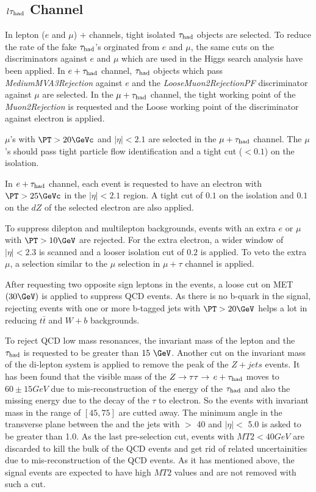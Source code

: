 \subsection{\texorpdfstring{$\,l\tau_{\rm had}$ Channel}{lepton-tau Channel}}
\label{sect:eleTauCuts}
In lepton ($e$ and $\mu$) $+$ \Tau channels, tight isolated $\tau_{\rm had}$ objects are selected. To reduce the rate of the fake $\tau_{\rm had}$'s orginated from $e$ and $\mu$, the same cuts on the discriminators against $e$ and $\mu$ which are used in the Higgs search analysis \cite{CMS_AN_2013-188} have been applied. In $e + \tau_{\rm had}$ channel, $\tau_{\rm had}$ objects which pass \emph{MediumMVA3Rejection} against $e$ and the \emph{LooseMuon2RejectionPF} discriminator against $\mu$ are selected. In the $\mu + \tau_{\rm had}$ channel, the tight working point of the \emph{Muon2Rejection} is requested and the Loose working point of the discriminator against electron is applied.

$\mu$'s with $\PT > 20 \GeVc$ and $|\eta|<2.1$ are selected in the $\mu + \tau_{\rm had}$ channel. The $\mu$'s should pass tight particle flow identification and a tight cut ($<0.1$) on the isolation.
 
In $e + \tau_{\rm had}$ channel, each event is requested to have an electron with $\PT >25 \GeVc$ in the $|\eta| < 2.1 $ region. A tight cut of $0.1$ on the isolation and $0.1$ on the $dZ$ of the selected electron are also applied.

To suppress dilepton and multilepton backgrounds, events with an extra $e$ or $\mu$ with $\PT >10 \GeV$ are rejected. For the extra electron, a wider window of $|\eta|<2.3$ is scanned and a looser isolation cut of $0.2$ is applied. To veto the extra $\mu$, a selection similar to the $\mu$ selection in $\mu+\tau$ channel is applied.

After requesting two opposite sign leptons in the events, a loose cut on MET $(30 \GeV)$ is applied to suppress QCD events. As there is no b-quark in the signal, rejecting events with one or more b-tagged jets with $\PT > 20 \GeV$ helps a lot in reducing $t\bar{t}$ and $W+b$ backgrounds.

To reject QCD low mass resonances, the invariant mass of the lepton and the $\tau_{\rm had}$ is requested to be greater than $15\ \GeV$. Another cut on the invariant mass of the di-lepton system is applied to remove the peak of the $Z+jets$ events. It has been found that the visible mass of the $Z\to\tau\tau\to\,e +\tau_{\rm had}$ moves to $60 \pm 15 GeV$ due to mis-reconstruction of the energy of the $\tau_{\rm had}$ and also the missing energy due to the decay of the $\tau$ to electron. So the events with invariant mass in the range of $[45,75]$ are cutted away. The minimum angle in the transverse plane between the \MET and the jets with \PT $>$ 40 \GeVc and $|\eta| <$ 5.0 is asked to be greater than 1.0. As the last pre-selection cut, events with $MT2<40 GeV$ are discarded to kill the bulk of the QCD events and get rid of related uncertainities due to mis-reconstruction of the QCD events. As it has mentioned above, the signal events are expected to have high $MT2$ values and are not removed with such a cut.

